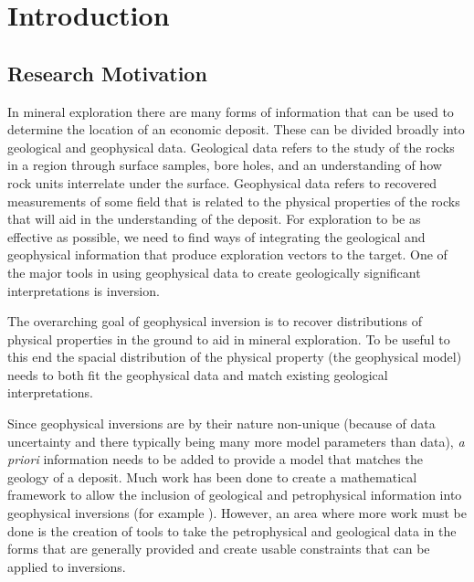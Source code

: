 
\chapter{Introduction}
\label{ch:Introduction}

\begin{epigraph}
\end{epigraph}

\section{Research Motivation}
\label{sec:Research Motivation}

In mineral exploration there are many forms of information that can be used to determine the location of an economic deposit. These can be divided broadly into geological and geophysical data. Geological data refers to the study of the rocks in a region through surface samples, bore holes, and an understanding of how rock units interrelate under the surface. Geophysical data refers to recovered measurements of some field that is related to the physical properties of the rocks that will aid in the understanding of the deposit. For exploration to be as effective as possible, we need to find ways of integrating the geological and geophysical information that produce exploration vectors to the target. One of the major tools in using geophysical data to create geologically significant interpretations is inversion.

The overarching goal of geophysical inversion is to recover distributions of physical properties in the ground to aid in mineral exploration. To be useful to this end the spacial distribution of the physical property (the geophysical model) needs to both fit the geophysical data and match existing geological interpretations. 

Since geophysical inversions are by their nature non-unique (because of data uncertainty and there typically being many more model parameters than data), \emph{a priori} information needs to be added to provide a model that matches the geology of a deposit. Much work has been done to create a mathematical framework to allow the inclusion of geological and petrophysical information into geophysical inversions (for example \cite{li19963}). However, an area where more work must be done is the creation of tools to take the petrophysical and geological data in the forms that are generally provided and create usable constraints that can be applied to inversions.

